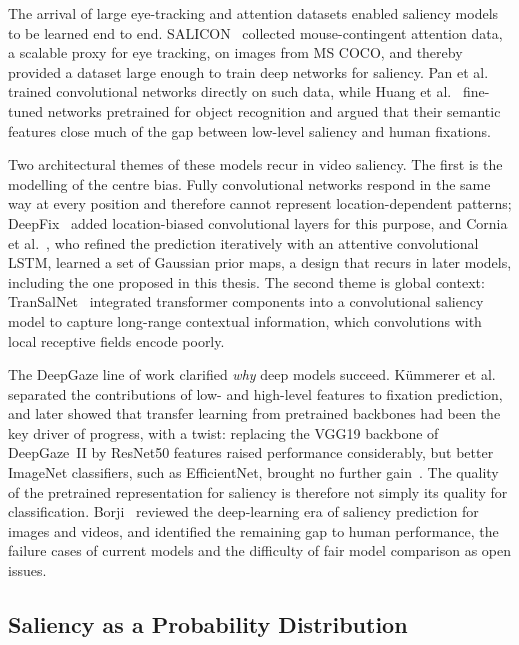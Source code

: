 The arrival of large eye-tracking and attention datasets enabled saliency models
to be learned end to end. SALICON~\cite{jiang2015salicon} collected
mouse-contingent attention data, a scalable proxy for eye tracking, on images
from MS COCO, and thereby provided a dataset large enough to train deep networks
for saliency. Pan et al.~\cite{pan2016shallow} trained convolutional
networks directly on such data, while Huang et al.~\cite{huang2015salicon}
fine-tuned networks pretrained for object recognition and argued that their
semantic features close much of the gap between low-level saliency and human
fixations.

Two architectural themes of these models recur in video saliency. The first is
the modelling of the centre bias. Fully convolutional networks respond in the
same way at every position and therefore cannot represent location-dependent
patterns; DeepFix~\cite{kruthiventi2017deepfix} added location-biased
convolutional layers for this purpose, and Cornia et
al.~\cite{cornia2018predicting}, who refined the prediction iteratively with an
attentive convolutional \acrshort{LSTM}, learned a set of Gaussian prior maps, a design
that recurs in later models, including the one proposed in this thesis. The
second theme is global context: TranSalNet~\cite{lou2022transalnet} integrated
transformer components into a convolutional saliency model to capture long-range
contextual information, which convolutions with local receptive fields encode
poorly.

The DeepGaze line of work clarified \emph{why} deep models succeed. K\"ummerer
et al.~\cite{kummerer2017understanding} separated the contributions of low- and
high-level features to fixation prediction, and later showed that transfer
learning from pretrained backbones had been the key driver of progress, with a
twist: replacing the VGG19 backbone of DeepGaze~II by ResNet50 features raised
performance considerably, but better ImageNet classifiers, such as EfficientNet,
brought no further gain~\cite{linardos2021deepgaze}. The quality of the
pretrained representation for saliency is therefore not simply its quality for
classification. Borji~\cite{borji2021saliency} reviewed the deep-learning era of
saliency prediction for images and videos, and identified the remaining gap to
human performance, the failure cases of current models and the difficulty of
fair model comparison as open issues.

\subsection{Saliency as a Probability Distribution}\label{sec:saliency-prob}

